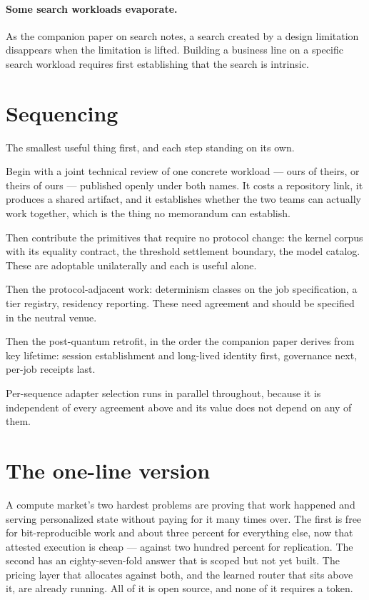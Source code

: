 \documentclass[11pt,a4paper]{article}
\begin{document}
\paragraph{Some search workloads evaporate.} As the companion paper on search
notes, a search created by a design limitation disappears when the limitation is
lifted. Building a business line on a specific search workload requires first
establishing that the search is intrinsic.

\section{Sequencing}

The smallest useful thing first, and each step standing on its own.

Begin with a joint technical review of one concrete workload --- ours of theirs,
or theirs of ours --- published openly under both names. It costs a repository
link, it produces a shared artifact, and it establishes whether the two teams can
actually work together, which is the thing no memorandum can establish.

Then contribute the primitives that require no protocol change: the kernel corpus
with its equality contract, the threshold settlement boundary, the model catalog.
These are adoptable unilaterally and each is useful alone.

Then the protocol-adjacent work: determinism classes on the job specification, a
tier registry, residency reporting. These need agreement and should be specified
in the neutral venue.

Then the post-quantum retrofit, in the order the companion paper derives from key
lifetime: session establishment and long-lived identity first, governance next,
per-job receipts last.

Per-sequence adapter selection runs in parallel throughout, because it is
independent of every agreement above and its value does not depend on any of
them.

\section{The one-line version}

A compute market's two hardest problems are proving that work happened and
serving personalized state without paying for it many times over. The first is
free for bit-reproducible work and about three percent for everything else, now
that attested execution is cheap --- against two hundred percent for replication.
The second has an eighty-seven-fold answer that is scoped but not yet built. The
pricing layer that allocates against both, and the learned router that sits above
it, are already running. All of it is open source, and none of it requires a
token.
\end{document}
